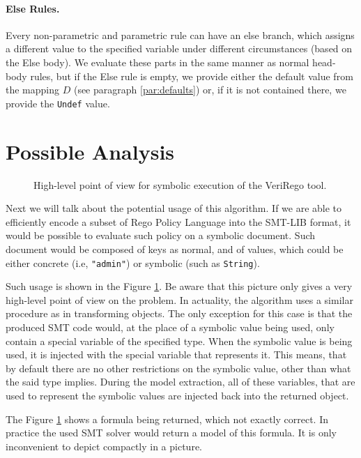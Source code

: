 \paragraph{Else Rules.}
Every non-parametric and parametric rule can have an else branch, which assigns a different value to the specified variable under different circumstances (based on the Else body).
We evaluate these parts in the same manner as normal head-body rules, but if the Else rule is empty, we provide either the default value from the mapping $D$ (see paragraph \ref{par:defaults}) or, if it is not contained there, we provide the \texttt{Undef} value.

\section{Possible Analysis}
\label{sec:analysis}

\begin{figure}
    \label{fig:verirego-analysis-symbolic}
    \centering
    
    \caption{High-level point of view for symbolic execution of the VeriRego tool.}
\end{figure}

Next we will talk about the potential usage of this algorithm.
If we are able to efficiently encode a subset of Rego Policy Language into the SMT-LIB format, it would be possible to evaluate such policy on a symbolic document.
Such document would be composed of keys as normal, and of values, which could be either concrete (i.e, \texttt{"admin"}) or symbolic (such as \texttt{String}).

Such usage is shown in the Figure \ref{fig:verirego-analysis-symbolic}.
Be aware that this picture only gives a very high-level point of view on the problem.
In actuality, the algorithm uses a similar procedure as in transforming objects.
The only exception for this case is that the produced SMT code would, at the place of a symbolic value being used, only contain a special variable of the specified type.
When the symbolic value is being used, it is injected with the special variable that represents it.
This means, that by default there are no other restrictions on the symbolic value, other than what the said type implies.
During the model extraction, all of these variables, that are used to represent the symbolic values are injected back into the returned object.

The Figure \ref{fig:verirego-analysis-symbolic} shows a formula being returned, which not exactly correct.
In practice the used SMT solver would return a model of this formula.
It is only inconvenient to depict compactly in a picture.

